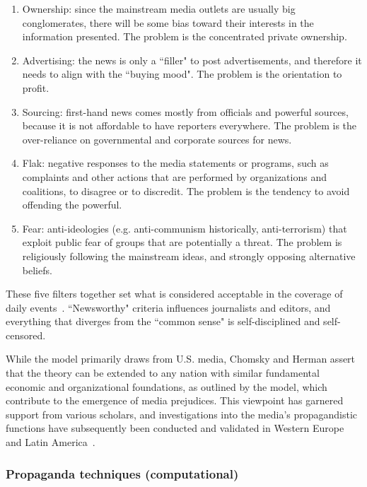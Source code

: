 \begin{enumerate}
    \item Ownership: since the mainstream media outlets are usually big conglomerates, there will be some bias toward their interests in the information presented. The problem is the concentrated private ownership.
    \item Advertising: the news is only a ``filler" to post advertisements, and therefore it needs to align with the ``buying mood". The problem is the orientation to profit.
    \item Sourcing: first-hand news comes mostly from officials and powerful sources, because it is not affordable to have reporters everywhere. The problem is the over-reliance on governmental and corporate sources for news.
    \item Flak: negative responses to the media statements or programs, such as complaints and other actions that are performed by organizations and coalitions, to disagree or to discredit. The problem is the tendency to avoid offending the powerful.
    \item Fear: anti-ideologies (e.g. anti-communism historically, anti-terrorism) that exploit public fear of groups that are potentially a threat. The problem is religiously following the mainstream ideas, and strongly opposing alternative beliefs.
\end{enumerate}

These five filters together set what is considered acceptable in the coverage of daily events~\citep{phillips2007left}. ``Newsworthy" criteria influences journalists and editors, and everything that diverges from the ``common sense" is self-disciplined and self-censored.

While the model primarily draws from U.S. media, Chomsky and Herman assert that the theory can be extended to any nation with similar fundamental economic and organizational foundations, as outlined by the model, which contribute to the emergence of media prejudices. This viewpoint has garnered support from various scholars, and investigations into the media's propagandistic functions have subsequently been conducted and validated in Western Europe and Latin America~\citep{herman1996propaganda}.


\subsubsection{Propaganda techniques (computational)}

